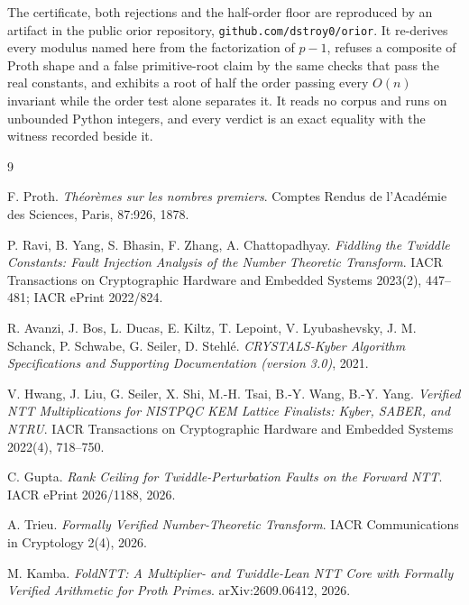 \documentclass{article}
\begin{document}
The certificate, both rejections and the half-order floor are reproduced by an artifact in the public orior repository, \texttt{github.com/dstroy0/orior}. It re-derives every modulus named here from the factorization of \(p-1\), refuses a composite of Proth shape and a false primitive-root claim by the same checks that pass the real constants, and exhibits a root of half the order passing every \(O(n)\) invariant while the order test alone separates it. It reads no corpus and runs on unbounded Python integers, and every verdict is an exact equality with the witness recorded beside it.

\begin{thebibliography}{9}

F. Proth.
\emph{Th\'eor\`emes sur les nombres premiers}.
Comptes Rendus de l'Acad\'emie des Sciences, Paris, 87:926, 1878.

P. Ravi, B. Yang, S. Bhasin, F. Zhang, A. Chattopadhyay.
\emph{Fiddling the Twiddle Constants: Fault Injection Analysis of the Number Theoretic Transform}.
IACR Transactions on Cryptographic Hardware and Embedded Systems 2023(2), 447--481; IACR ePrint 2022/824.

R. Avanzi, J. Bos, L. Ducas, E. Kiltz, T. Lepoint, V. Lyubashevsky, J. M. Schanck, P. Schwabe, G. Seiler, D. Stehl\'e.
\emph{CRYSTALS-Kyber Algorithm Specifications and Supporting Documentation (version 3.0)}, 2021.

V. Hwang, J. Liu, G. Seiler, X. Shi, M.-H. Tsai, B.-Y. Wang, B.-Y. Yang.
\emph{Verified NTT Multiplications for NISTPQC KEM Lattice Finalists: Kyber, SABER, and NTRU}.
IACR Transactions on Cryptographic Hardware and Embedded Systems 2022(4), 718--750.

C. Gupta.
\emph{Rank Ceiling for Twiddle-Perturbation Faults on the Forward NTT}.
IACR ePrint 2026/1188, 2026.

A. Trieu.
\emph{Formally Verified Number-Theoretic Transform}.
IACR Communications in Cryptology 2(4), 2026.

M. Kamba.
\emph{FoldNTT: A Multiplier- and Twiddle-Lean NTT Core with Formally Verified Arithmetic for Proth Primes}.
arXiv:2609.06412, 2026.

\end{thebibliography}
\end{document}
